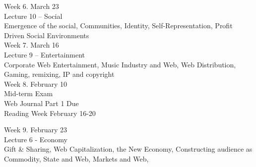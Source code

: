 {Week 6. March 23 \\
Lecture 10 – Social \\
Emergence of the social, Communities, Identity, Self-Representation, Profit Driven Social Environments \\

Week 7. March 16 \\
Lecture 9 – Entertainment \\
Corporate Web Entertainment, Music Industry and Web, Web Distribution, Gaming, remixing, IP and copyright \\

Week 8. February 10 \\
Mid-term Exam \\
Web Journal Part 1 Due \\

Reading Week February 16-20

Week 9. February 23 \\
Lecture 6 - Economy \\
Gift \& Sharing, Web Capitalization, the New Economy, Constructing audience as Commodity, State and Web, Markets and Web, \\

}
